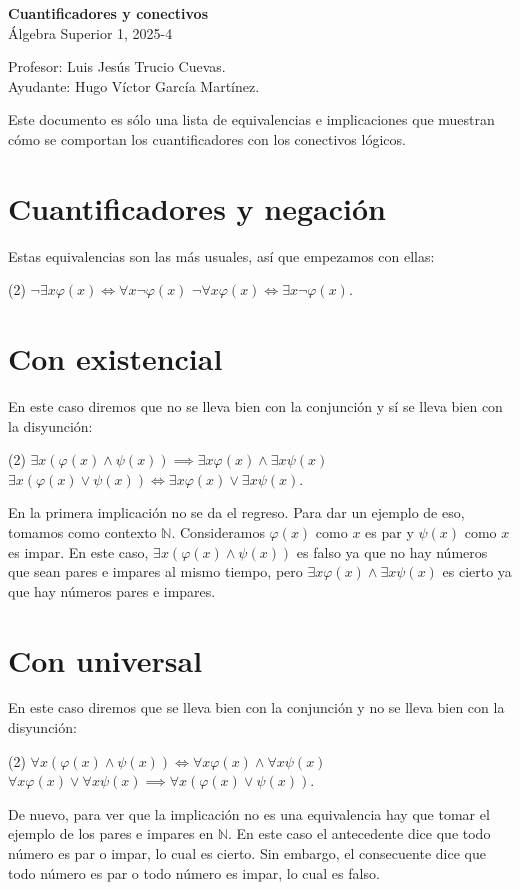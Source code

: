 \documentclass[letterpaper,DIV=12,headsepline,12pt]{scrartcl}
\begin{document}
\thispagestyle{beginstyle}
\begin{center}
  {\fontsize{30}{60}\rmfamily \textbf{Cuantificadores y conectivos}}
  \\ \vspace{.2cm}
  Álgebra Superior 1, 2025-4
\end{center}
\begin{flushright}
  \footnotesize \hfill Profesor: Luis Jesús Trucio Cuevas.\\
  \hfill Ayudante: Hugo Víctor García Martínez.
\end{flushright}

\noindent
Este documento es sólo una lista de equivalencias e implicaciones que muestran
cómo se comportan los cuantificadores con los conectivos lógicos.

\section{Cuantificadores y negación}
Estas equivalencias son las más usuales, así que empezamos con ellas:
\begin{tasks}(2)
  \task \(\neg\exists x\varphi(x)\iff\forall x\neg\varphi(x)\)
  \task \(\neg\forall x\varphi(x)\iff\exists x\neg\varphi(x)\).
\end{tasks}

\section{Con existencial}\label{sec:excon}
En este caso diremos que
no se lleva bien con la conjunción y sí se lleva bien con la disyunción:
\begin{tasks}(2)
  \task \(\exists x(\varphi(x)\land\psi(x))\implies\exists x\varphi(x)\land\exists x\psi(x)\)
  \task \(\exists x(\varphi(x)\lor\psi(x))\iff\exists x\varphi(x)\lor\exists x\psi(x)\).
\end{tasks}
En la primera implicación no se da el regreso. Para dar un ejemplo de eso,
tomamos como contexto \(\mathbb{N}\). Consideramos \(\varphi(x)\) como \(x\) es
par y \(\psi(x)\) como \(x\) es impar. En este caso, 
\(\exists x(\varphi(x)\land\psi(x))\) es falso ya que no hay números que
sean pares e impares al mismo tiempo, pero
\(\exists x\varphi(x)\land\exists x\psi(x)\) es cierto ya que hay números pares
e impares.

\section{Con universal}\label{sec:unicon}
En este caso diremos que se lleva bien con la conjunción y no se lleva bien con
la disyunción:
\begin{tasks}(2)
  \task \(\forall x(\varphi(x)\land\psi(x))\iff\forall x\varphi(x)\land\forall x\psi(x)\)
  \task \(\forall x\varphi(x)\lor\forall x\psi(x)\implies\forall x(\varphi(x)\lor\psi(x))\).
\end{tasks}
De nuevo, para ver que la implicación no es una equivalencia hay que tomar el
ejemplo de los pares e impares en \(\mathbb{N}\). En este caso el antecedente
dice que todo número es par o impar, lo cual es cierto. Sin embargo, el
consecuente dice que todo número es par o todo número es impar, lo cual es
falso.
\end{document}
